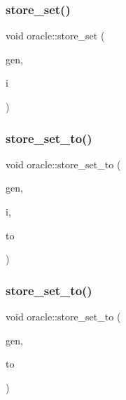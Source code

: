 \mbox{\label{classoracle_abbf5fae543cb81c13c03282968faf9ad}} 
\subsubsection{\texorpdfstring{store\+\_\+set()}{store\_set()}}
{\footnotesize\ttfamily void oracle\+::store\+\_\+set (\begin{DoxyParamCaption}\item[{\mbox{\hyperlink{classgenerator}{generator}} $\ast$}]{gen,  }\item[{\mbox{\hyperlink{galois_8h_a09fddde158a3a20bd2dcadb609de11dc}{I\+NT}}}]{i }\end{DoxyParamCaption})}

\mbox{\label{classoracle_a4489d03d342f31d1e64632ce4d0e700d}} 
\subsubsection{\texorpdfstring{store\+\_\+set\+\_\+to()}{store\_set\_to()}\hspace{0.1cm}{\footnotesize\ttfamily [1/2]}}
{\footnotesize\ttfamily void oracle\+::store\+\_\+set\+\_\+to (\begin{DoxyParamCaption}\item[{\mbox{\hyperlink{classgenerator}{generator}} $\ast$}]{gen,  }\item[{\mbox{\hyperlink{galois_8h_a09fddde158a3a20bd2dcadb609de11dc}{I\+NT}}}]{i,  }\item[{\mbox{\hyperlink{galois_8h_a09fddde158a3a20bd2dcadb609de11dc}{I\+NT}} $\ast$}]{to }\end{DoxyParamCaption})}

\mbox{\label{classoracle_a2362d250f6497a78f842be427ddba723}} 
\subsubsection{\texorpdfstring{store\+\_\+set\+\_\+to()}{store\_set\_to()}\hspace{0.1cm}{\footnotesize\ttfamily [2/2]}}
{\footnotesize\ttfamily void oracle\+::store\+\_\+set\+\_\+to (\begin{DoxyParamCaption}\item[{\mbox{\hyperlink{classgenerator}{generator}} $\ast$}]{gen,  }\item[{\mbox{\hyperlink{galois_8h_a09fddde158a3a20bd2dcadb609de11dc}{I\+NT}} $\ast$}]{to }\end{DoxyParamCaption})}


